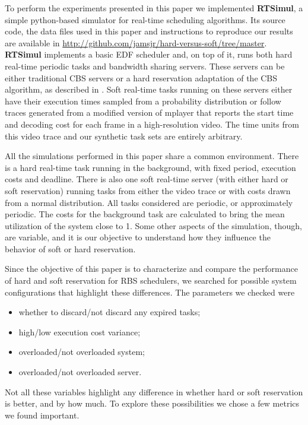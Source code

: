 \documentclass[times, 10pt,twocolumn]{article}
\newcommand{\simul}{\textbf{RTSimul}} %
\begin{document}
To perform the experiments presented in this paper we implemented
\simul{}, a simple python-based simulator for real-time scheduling
algorithms. Its source code, the data files used in this paper and
instructions to reproduce our results are available in
\url{http://github.com/jamsjr/hard-versus-soft/tree/master}. \simul{}
implements a basic EDF scheduler and, on top of it, runs both hard
real-time periodic tasks and bandwidth sharing servers. These servers
can be either traditional CBS servers \cite{abeni.ea98:integrating} or
a hard reservation adaptation of the CBS algorithm, as described in
\cite{buttazzo05:soft}. Soft real-time tasks running on these servers
either have their execution times sampled from a probability
distribution or follow traces generated from a modified version of
mplayer that reports the start time and decoding cost for each frame
in a high-resolution video. The time units from this video trace and
our synthetic task sets are entirely arbitrary.

All the simulations performed in this paper share a common
environment. There is a hard real-time task running in the background,
with fixed period, execution costs and deadline. There is also one
soft real-time server (with either hard or soft reservation) running
tasks from either the video trace or with costs drawn from a normal
distribution. All tasks considered are periodic, or approximately
periodic. The costs for the background task are calculated to bring
the mean utilization of the system close to 1. Some other aspects of
the simulation, though, are variable, and it is our objective to
understand how they influence the behavior of soft or hard
reservation.

\label{sec:controled-variables}

Since the objective of this paper is to characterize and compare the
performance of hard and soft reservation for RBS schedulers, we
searched for possible system configurations that highlight these
differences. The parameters we checked were
\begin{itemize}
\item whether to discard/not discard any expired tasks;
\item high/low execution cost variance;
\item overloaded/not overloaded system;
\item overloaded/not overloaded server.
\end{itemize}

Not all these variables highlight any difference in whether hard or
soft reservation is better, and by how much. To explore these
possibilities we chose a few metrics we found important.
\end{document}
